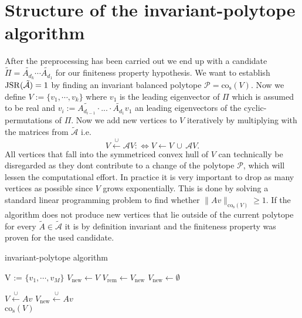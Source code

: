 \section{Structure of the invariant-polytope algorithm}
After the preprocessing has been carried out we end up with a candidate $\tilde{\Pi} = \tilde{A_{d_k}} \cdots \tilde{A_{d_1}}$ for our finiteness property hypothesis. We want to establish $\operatorname{JSR}(\tilde{\mathcal{A}}) = 1$ by finding an invariant balanced polytope $\mathcal{P} = \text{co}_{\text{s}}(V)$. Now we define $V := \{ v_1, \cdots, v_k \}$ where $v_1$ is the leading eigenvector of $\Pi$ which is assumed to be real and $v_i := \tilde{A_{d_{i-1}}}\cdot ... \cdot \tilde{A_{d_1}}v_1$ an leading eigenvectors of the cyclic-permutations of $\Pi$. 
Now we add new vertices to $V$ iteratively by multiplying with the matrices from $\tilde{\mathcal{A}}$ i.e. $$ V \xleftarrow{\cup} \mathcal{A}V :\iff V \leftarrow V \, \cup \, \mathcal{A}V. $$ All vertices that fall into the symmetriced convex hull of $V$ can technically be disregarded as they dont contribute to a change of the polytope $\mathcal{P}$, which will lessen the computational effort. In practice it is very important to drop as many vertices as possible since $V$ grows exponentially. This is done by solving a standard linear programming problem to find whether $\lVert Av \rVert _{\text{co}_{\text{s}}(V)} \geq 1$. 
If the algorithm does not produce new vertices that lie outside of the current polytope for every $\tilde{A} \in \tilde{\mathcal{A}}$ it is by definition invariant and the finiteness property was proven for the used candidate.

\vspace{1cm}

\FloatBarrier

\begin{algorithm}
\caption{invariant-polytope algorithm}
\label{alg:exact}
\begin{algorithmic}

\State V := $\{v_1, \cdots, v_M\}$
\State $V_{\text{new}} \gets V$
\State $V_{\text{rem}} \gets V_{\text{new}}$
\State $V_{\text{new}} \gets \emptyset$

\State $V \xleftarrow{\cup} Av$
\State $V_{\text{new}} \xleftarrow{\cup} Av$
\EndIf
\EndFor
\EndFor
\EndWhile \\
\Return $\text{co}_{\text{s}}(V)$ \\
\end{algorithmic} 
\end{algorithm}

